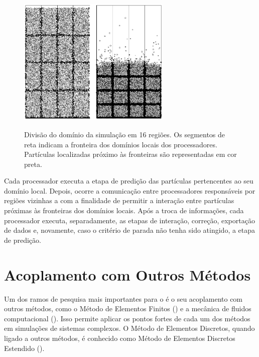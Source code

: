 \begin{figure}[h]
	\caption{Divisão do domínio da simulação em 16 regiões. Os segmentos de reta indicam a fronteira dos domínios locais dos processadores. Partículas localizadas próximo às fronteiras são representadas em cor preta.}
	\centering
		\includegraphics[width=0.65\textwidth]{images/discrete_element_method/parallelization/domain_division}
	\label{fig:discrete_element_method:parallelization}
\end{figure}

Cada processador executa a etapa de predição das partículas pertencentes ao seu domínio local. Depois, ocorre a comunicação entre processadores responsáveis por regiões vizinhas a com a finalidade de permitir a interação entre partículas próximas às fronteiras dos domínios locais. Após a troca de informações, cada processador executa, separadamente, as etapas de interação, correção, exportação de dados e, novamente, caso o critério de parada não tenha sido atingido, a etapa de predição.

\section{Acoplamento com Outros Métodos} \label{sec:discrete_element_method:coupling_with_other_methods}

Um dos ramos de pesquisa mais importantes para o \DEM{} é o seu acoplamento com outros métodos, como o Método de Elementos Finitos (\FEM{}) e a mecânica de fluidos computacional (\CFD{}). Isso permite aplicar os pontos fortes de cada um dos métodos em simulações de sistemas complexos. O Método de Elementos Discretos, quando ligado a outros métodos, é conhecido como Método de Elementos Discretos Estendido (\XDEM{}).

